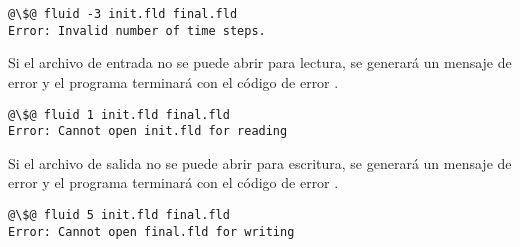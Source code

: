 \begin{lstlisting}[style=terminal,escapechar=@]
@\$@ fluid -3 init.fld final.fld
Error: Invalid number of time steps.
\end{lstlisting}

Si el archivo de entrada no se puede abrir para lectura,
se generará un mensaje de error y el programa terminará con el código de error 
.

\begin{lstlisting}[style=terminal,escapechar=@]
@\$@ fluid 1 init.fld final.fld
Error: Cannot open init.fld for reading
\end{lstlisting}

Si el archivo de salida no se puede abrir para escritura, 
se generará un mensaje de error y el programa terminará con el código de error 
.

\begin{lstlisting}[style=terminal,escapechar=@]
@\$@ fluid 5 init.fld final.fld
Error: Cannot open final.fld for writing
\end{lstlisting}
